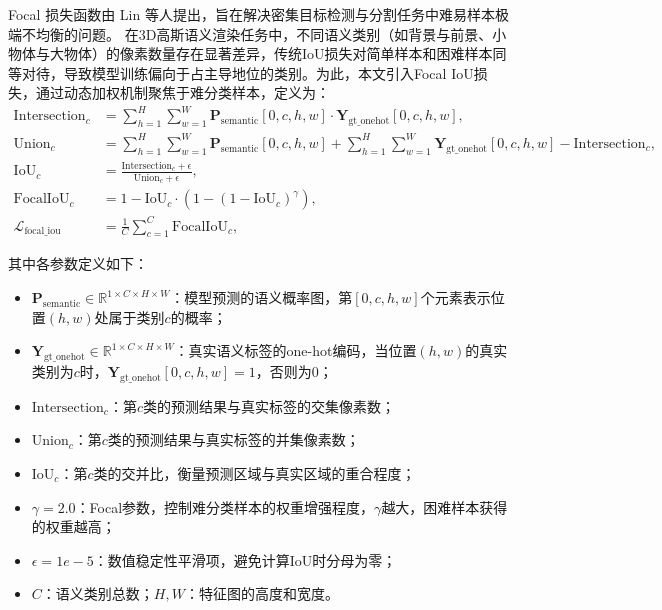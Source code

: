 Focal 损失函数由 Lin\cite{focal} 等人提出，旨在解决密集目标检测与分割任务中难易样本极端不均衡的问题。
在3D高斯语义渲染任务中，不同语义类别（如背景与前景、小物体与大物体）的像素数量存在显著差异，传统IoU损失对简单样本和困难样本同等对待，导致模型训练偏向于占主导地位的类别。为此，本文引入Focal IoU损失，通过动态加权机制聚焦于难分类样本，定义为：
\begin{equation}
\begin{aligned}
\text{Intersection}_c &= \sum_{h=1}^H\sum_{w=1}^W \mathbf{P}_{\text{semantic}}[0,c,h,w] \cdot \mathbf{Y}_{\text{gt\_onehot}}[0,c,h,w], \\
\text{Union}_c &= \sum_{h=1}^H\sum_{w=1}^W \mathbf{P}_{\text{semantic}}[0,c,h,w] + \sum_{h=1}^H\sum_{w=1}^W \mathbf{Y}_{\text{gt\_onehot}}[0,c,h,w] - \text{Intersection}_c, \\
\text{IoU}_c &= \frac{\text{Intersection}_c + \epsilon}{\text{Union}_c + \epsilon}, \\
\text{FocalIoU}_c &= 1 - \text{IoU}_c \cdot \left(1 - (1 - \text{IoU}_c)^\gamma\right), \\
\mathcal{L}_{\text{focal\_iou}} &= \frac{1}{C} \sum_{c=1}^C \text{FocalIoU}_c,
\end{aligned}
\end{equation}

其中各参数定义如下：
\begin{itemize}
    \item $\mathbf{P}_{\text{semantic}} \in \mathbb{R}^{1 \times C \times H \times W}$：模型预测的语义概率图，第$[0,c,h,w]$个元素表示位置$(h,w)$处属于类别$c$的概率；
    \item $\mathbf{Y}_{\text{gt\_onehot}} \in \mathbb{R}^{1 \times C \times H \times W}$：真实语义标签的one-hot编码，当位置$(h,w)$的真实类别为$c$时，$\mathbf{Y}_{\text{gt\_onehot}}[0,c,h,w] = 1$，否则为0；
    \item $\text{Intersection}_c$：第$c$类的预测结果与真实标签的交集像素数；
    \item $\text{Union}_c$：第$c$类的预测结果与真实标签的并集像素数；
    \item $\text{IoU}_c$：第$c$类的交并比，衡量预测区域与真实区域的重合程度；
    \item $\gamma = 2.0$：Focal参数，控制难分类样本的权重增强程度，$\gamma$越大，困难样本获得的权重越高；
    \item $\epsilon = 1e-5$：数值稳定性平滑项，避免计算IoU时分母为零；
    \item $C$：语义类别总数；$H, W$：特征图的高度和宽度。
\end{itemize}

